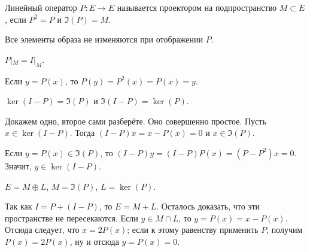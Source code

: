 \begin{Def}
 Линейный оператор $P\colon E\to E$ называется проектором на подпространство $M\subset E$, если $P^2=P$ и $\Im(P) = M$.
\end{Def}
Все элементы образа не изменяются при отображении $P$.
\begin{Ut}
  $P|_M = I|_M$.
\end{Ut}
\begin{Proof}
  Если $y = P(x)$, то $P(y) = P^2(x) = P(x) = y$.
\end{Proof}
\begin{Ut}
  $\ker(I-P) = \Im(P)$ и $\Im(I-P) = \ker(P)$.
\end{Ut}
\begin{Proof}
Докажем одно, второе сами разберёте. Оно совершенно простое. Пусть $x\in \ker(I-P)$. Тогда $(I-P)x =x-P(x) = 0$ и $x\in \Im(P)$.

Если $y = P(x)\in\Im(P)$, то $(I-P)y =(I-P)P(x) = (P-P^2)x=0$. Значит, $y\in \ker(I-P)$.
\end{Proof}
\begin{Ut}
 $E = M\oplus L$, $M = \Im(P)$, $L = \ker(P)$.
\end{Ut}
\begin{Proof}
Так как $I = P + (I-P)$, то $E = M+L$. Осталось доказать, что эти пространстве не пересекаются. Если $y\in M\cap L$, то $y = P(x)=x-P(x)$. Отсюда следует, что $x = 2 P(x)$; если к этому равенству применить $P$, получим $P(x) = 2P(x)$, ну и отсюда $y = P(x) = 0$.
\end{Proof}

